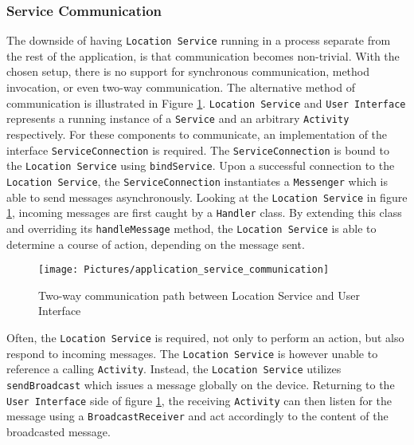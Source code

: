 \subsubsection{Service Communication}\label{subsubsec:service_communication}
The downside of having \texttt{Location Service} running in a process separate from the rest of the application, is that communication becomes non-trivial. With the chosen setup, there is no support for synchronous communication, method invocation, or even two-way communication. The alternative method of communication is illustrated in Figure \ref{fig:application_service_communication}.   \texttt{Location Service} and \texttt{User Interface} represents a running instance of a \texttt{Service} and an arbitrary \texttt{Activity} respectively. For these components to communicate, an implementation of the interface \texttt{ServiceConnection} is required\citep{android_serviceconnection}.  The \texttt{ServiceConnection} is bound to the \texttt{Location Service} using \texttt{bindService}\citep{android_bindservice}. Upon a successful connection to the \texttt{Location Service}, the \texttt{ServiceConnection} instantiates a \texttt{Messenger}\citep{android_messenger} which is able to send messages asynchronously. Looking at the \texttt{Location Service} in figure \ref{fig:application_service_communication}, incoming messages are first caught by a \texttt{Handler}\citep{android_handler} class. By extending this class and overriding its \texttt{handleMessage} method, the \texttt{Location Service} is able to determine a course of action, depending on the message sent.

\begin{figure}[tb]
\centering
\texttt{[image: Pictures/application\_service\_communication]}
\caption{Two-way communication path between Location Service and User Interface}
\label{fig:application_service_communication}
\end{figure}

Often, the \texttt{Location Service} is required, not only to perform an action, but also respond to incoming messages. The \texttt{Location Service} is however unable to reference a calling \texttt{Activity}. Instead, the \texttt{Location Service} utilizes \texttt{sendBroadcast}\citep{android_sendbroadcast} which issues a message globally on the device. Returning to the \texttt{User Interface} side of figure \ref{fig:application_service_communication}, the receiving \texttt{Activity} can then listen for the message using a \texttt{BroadcastReceiver}\citep{android_broadcastreceiver} and act accordingly to the content of the broadcasted message. 

